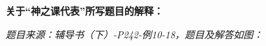 % 
% 
% 
% 
% 
% 
% 
% 
% 
% 
% 
% 
% 
% 
% 
% 
% 
% 
% 
% 
% 
% 
% 
% 
% 
% 
% 
% 


\visiblefalse

\ifvisible

	\newpage
	
	{\bf 关于“神之课代表”所写题目的解释：}
	
	{\it 题目来源：辅导书（下）-P242-例10-18，题目及解答如图：}
	
	\begin{center}
	\end{center}
	
